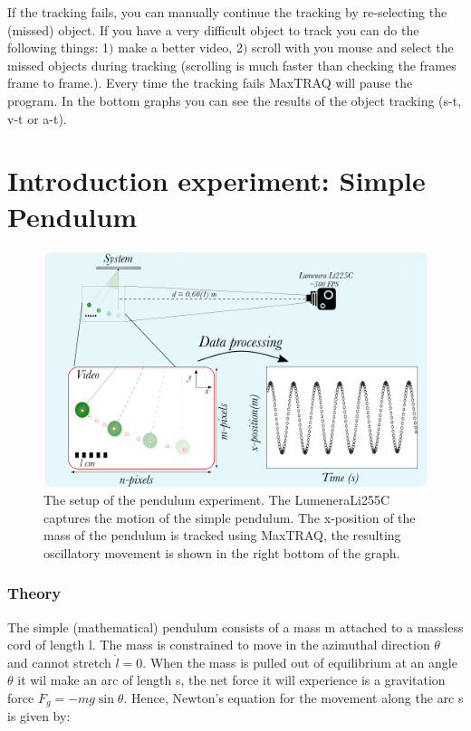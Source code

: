 \documentclass{article}
\begin{document}
\begin{itemize}
If the tracking fails, you can manually continue the tracking by re-selecting the (missed) object. If you have a very difficult object to track you can do the following things: 1$)$ make a better video, 2$)$ scroll with you mouse and select the missed objects during tracking (scrolling is much faster than checking the frames frame to frame.). Every time the tracking fails MaxTRAQ will pause the program. In the bottom graphs you can see the results of the object tracking (s-t, v-t or a-t).
\end{itemize}

\newpage

\section{Introduction experiment: Simple Pendulum}
\begin{figure}[H]
    \centering
    \includegraphics[width=12cm]{figures/Pendulum setup.png}
    \caption{The setup of the pendulum experiment. The LumeneraLi255C captures the motion of the simple pendulum. The x-position of the mass of the pendulum is tracked using MaxTRAQ, the resulting oscillatory movement is shown in the right bottom of the graph.}
    \label{Figure: Pendulum setup}
\end{figure}
\subsubsection{Theory}
The simple (mathematical) pendulum consists of a mass m attached to a massless cord of length l. The mass is constrained to move in the azimuthal direction $\theta$ and cannot stretch $\dot{l}=0$. When the mass is pulled out of equilibrium at an angle $\theta$ it wil make an arc of length s, the net force it will experience is a gravitation force $F_g = -mg\sin{\theta}$. Hence, Newton's equation for the movement along the arc s is given by:
\end{document}
